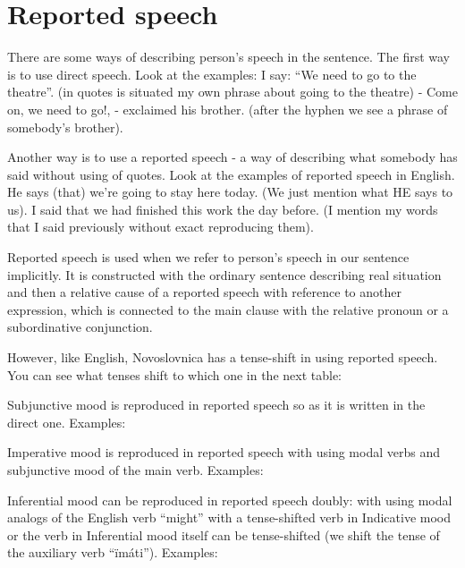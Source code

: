 \section{Reported speech}

There are some ways of describing person’s speech in the sentence. The first way is to use direct speech. Look at the examples:
I say: “We need to go to the theatre”. (in quotes is situated my own phrase about going to the theatre)
- Come on, we need to go!, - exclaimed his brother. (after the hyphen we see a phrase of somebody’s brother).

Another way is to use a reported speech - a way of describing what somebody has said without using of quotes. Look at the examples of reported speech in English.
He says (that) we’re going to stay here today. (We just mention what HE says to us).
I said that we had finished this work the day before. (I mention my words that I said previously without exact reproducing them).

Reported speech is used when we refer to person’s speech in our sentence implicitly. It is constructed with the ordinary sentence describing real situation and then a relative cause of a reported speech with reference to another expression, which is connected to the main clause with the relative pronoun or a subordinative conjunction.

However, like English, Novoslovnica has a tense-shift in using reported speech. You can see what tenses shift to which one in the next table:


Subjunctive mood is reproduced in reported speech so as it is written in the direct one. 
Examples:


Imperative mood is reproduced in reported speech with using modal verbs and subjunctive mood of the main verb.
Examples:

Inferential mood can be reproduced in reported speech doubly: with using modal analogs of the English verb “might” with a tense-shifted verb in Indicative mood or the verb in Inferential mood itself can be tense-shifted (we shift the tense of the auxiliary verb “ïmáti”).
Examples: 
